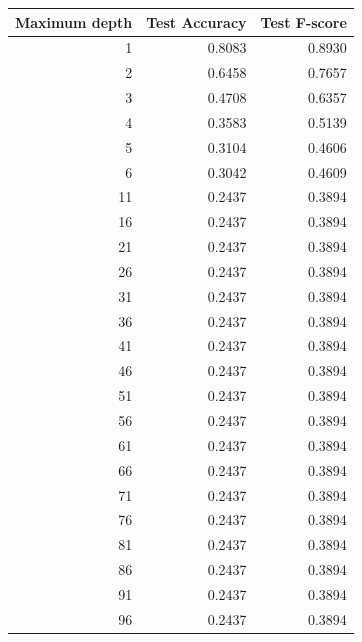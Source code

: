 \documentclass{article}
\begin{document}
\begin{minipage}{0.49\textwidth}
    \centering
    \begin{tabular}{rrr}
        \toprule
        Maximum depth & Test Accuracy & Test F-score \\
        \midrule
        1 & {0.8083} & {0.8930} \\
        2 & {0.6458} & {0.7657} \\
        3 & {0.4708} & {0.6357} \\
        4 & {0.3583} & {0.5139} \\
        5 & {0.3104} & {0.4606} \\
        6 & {0.3042} & {0.4609} \\
        11 & {0.2437} & {0.3894} \\
        16 & {0.2437} & {0.3894} \\
        21 & {0.2437} & {0.3894} \\
        26 & {0.2437} & {0.3894} \\
        31 & {0.2437} & {0.3894} \\
        36 & {0.2437} & {0.3894} \\
        41 & {0.2437} & {0.3894} \\
        46 & {0.2437} & {0.3894} \\
        51 & {0.2437} & {0.3894} \\
        56 & {0.2437} & {0.3894} \\
        61 & {0.2437} & {0.3894} \\
        66 & {0.2437} & {0.3894} \\
        71 & {0.2437} & {0.3894} \\
        76 & {0.2437} & {0.3894} \\
        81 & {0.2437} & {0.3894} \\
        86 & {0.2437} & {0.3894} \\
        91 & {0.2437} & {0.3894} \\
        96 & {0.2437} & {0.3894} \\
        \bottomrule
    \end{tabular}
\end{minipage}
\restoregeometry
\end{document}
